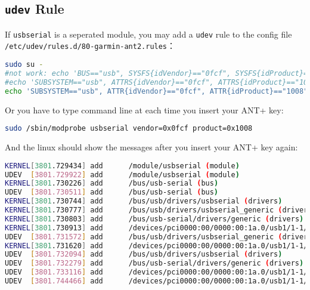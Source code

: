 \documentclass[letter,12pt,onecolumn]{article}
\newcommand{\cnt}[3]{{#1}{#2}{#3}}
\renewcommand{\cnt}[3]{#2}
\renewcommand{\cnt}[3]{#3}
\renewcommand{\cnt}[3]{#1}
\begin{document}
\subsection{\texttt{udev} Rule}
\cnt{If \texttt{usbserial} is a seperated module,}
    {如果 \texttt{usbserial} 是分立的模块，则可以}
    {如果 \texttt{usbserial} 是分立的模組，則可以}
\cnt{you may add a \texttt{udev} rule to the config file \texttt{/etc/udev/rules.d/80-garmin-ant2.rules}：}
    {则可以加入一条 \texttt{udev} 规则到配置文件 \texttt{/etc/udev/rules.d/80-garmin-ant2.rules}：}
    {則可以加入一條 \texttt{udev} 規則到配置文件 \texttt{/etc/udev/rules.d/80-garmin-ant2.rules}：}
\begin{lstlisting}[language=bash]
sudo su -
#not work: echo 'BUS=="usb", SYSFS{idVendor}=="0fcf", SYSFS{idProduct}=="1008", RUN+="/sbin/modprobe usbserial vendor=0x0fcf product=0x1008"' > /etc/udev/rules.d/80-garmin-ant2.rules
#echo 'SUBSYSTEM=="usb", ATTRS{idVendor}=="0fcf", ATTRS{idProduct}=="1008", RUN+="/sbin/modprobe usbserial vendor=0x0fcf product=0x1008"' > /etc/udev/rules.d/80-garmin-ant2.rules
echo 'SUBSYSTEM=="usb", ATTR{idVendor}=="0fcf", ATTR{idProduct}=="1008", MODE="0666", SYMLINK+="ttyANT", ACTION=="add", RUN+="/sbin/modprobe usbserial vendor=0x0fcf product=0x1008"' > /etc/udev/rules.d/80-garmin-ant2.rules
\end{lstlisting}

\cnt{Or you have to type command line at each time you insert your ANT+ key:}
    {或者在每次插入 key 后手工输入：}
    {或者在每次插入 key 後手工輸入：}
\begin{lstlisting}[language=bash]
sudo /sbin/modprobe usbserial vendor=0x0fcf product=0x1008
\end{lstlisting}

\cnt{And the linux should show the messages after you insert your ANT+ key again:}
    {然后重插入 ANT+ key， \texttt{udevadm monitor} 会显示：}
    {然後重插入 ANT+ key， \texttt{udevadm monitor} 會顯示：}
\begin{lstlisting}[language=bash]
KERNEL[3801.729434] add      /module/usbserial (module)
UDEV  [3801.729922] add      /module/usbserial (module)
KERNEL[3801.730226] add      /bus/usb-serial (bus)
UDEV  [3801.730511] add      /bus/usb-serial (bus)
KERNEL[3801.730744] add      /bus/usb/drivers/usbserial (drivers)
KERNEL[3801.730777] add      /bus/usb/drivers/usbserial_generic (drivers)
KERNEL[3801.730803] add      /bus/usb-serial/drivers/generic (drivers)
KERNEL[3801.730913] add      /devices/pci0000:00/0000:00:1a.0/usb1/1-1/1-1.2/1-1.2:1.0/ttyUSB0 (usb-serial)
UDEV  [3801.731572] add      /bus/usb/drivers/usbserial_generic (drivers)
KERNEL[3801.731620] add      /devices/pci0000:00/0000:00:1a.0/usb1/1-1/1-1.2/1-1.2:1.0/ttyUSB0/tty/ttyUSB0 (tty)
UDEV  [3801.732094] add      /bus/usb/drivers/usbserial (drivers)
UDEV  [3801.732279] add      /bus/usb-serial/drivers/generic (drivers)
UDEV  [3801.733116] add      /devices/pci0000:00/0000:00:1a.0/usb1/1-1/1-1.2/1-1.2:1.0/ttyUSB0 (usb-serial)
UDEV  [3801.744466] add      /devices/pci0000:00/0000:00:1a.0/usb1/1-1/1-1.2/1-1.2:1.0/ttyUSB0/tty/ttyUSB0 (tty)
\end{lstlisting}
\end{document}
